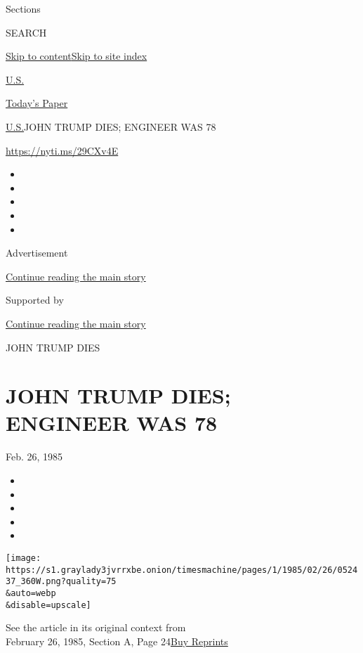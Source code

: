 Sections

SEARCH

\protect\hyperlink{site-content}{Skip to
content}\protect\hyperlink{site-index}{Skip to site index}

\href{https://www.nytimes3xbfgragh.onion/section/us}{U.S.}

\href{https://myaccount.nytimes3xbfgragh.onion/auth/login?response_type=cookie\&client_id=vi}{}

\href{https://www.nytimes3xbfgragh.onion/section/todayspaper}{Today's
Paper}

\href{/section/us}{U.S.}\textbar{}JOHN TRUMP DIES; ENGINEER WAS 78

\url{https://nyti.ms/29CXv4E}

\begin{itemize}
\item
\item
\item
\item
\item
\end{itemize}

Advertisement

\protect\hyperlink{after-top}{Continue reading the main story}

Supported by

\protect\hyperlink{after-sponsor}{Continue reading the main story}

JOHN TRUMP DIES

\hypertarget{john-trump-dies-engineer-was-78}{%
\section{JOHN TRUMP DIES; ENGINEER WAS
78}\label{john-trump-dies-engineer-was-78}}

Feb. 26, 1985

\begin{itemize}
\item
\item
\item
\item
\item
\end{itemize}

\texttt{[image: https://s1.graylady3jvrrxbe.onion/timesmachine/pages/1/1985/02/26/052437\_360W.png?quality=75\\\&auto=webp\\\&disable=upscale]}

See the article in its original context from\\
February 26, 1985, Section A, Page
24\href{https://store.nytimes3xbfgragh.onion/collections/new-york-times-page-reprints?utm_source=nytimes\&utm_medium=article-page\&utm_campaign=reprints}{Buy
Reprints}

